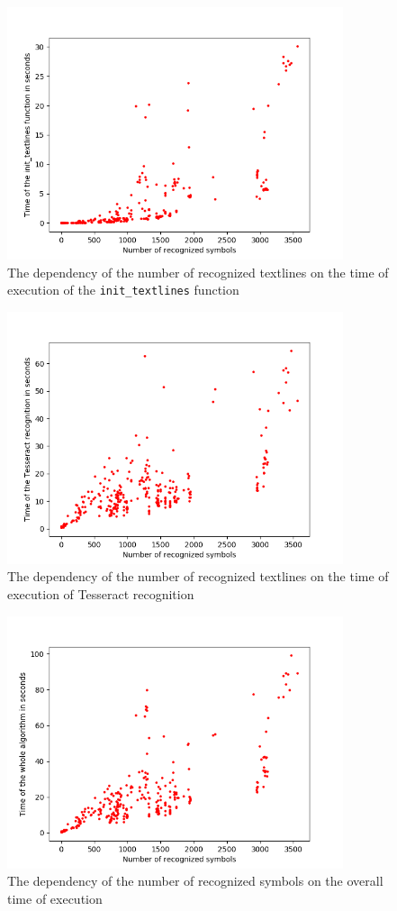 \begin{figure}
\centering
\includegraphics[height=20em]{img/results/symbolsTimeInit.png}
\caption{The dependency of the number of recognized textlines on the time of execution of the \texttt{init\_textlines} function}
\label{fig:symbolsTimeInit}
\end{figure}

\begin{figure}
\centering
\includegraphics[height=20em]{img/results/symbolsTimeTesseract.png}
\caption{The dependency of the number of recognized textlines on the time of execution of Tesseract recognition}
\label{fig:symbolsTimeTess}
\end{figure}

\begin{figure}
\centering
\includegraphics[height=20em]{img/results/symbolsTimeAll.png}
\caption{The dependency of the number of recognized symbols on the overall time of execution}
\label{fig:symbolsTime}
\end{figure}


